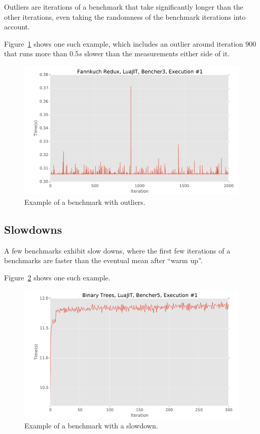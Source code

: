 \documentclass[10pt,preprint]{sigplanconf}
\begin{document}
Outliers are iterations of a benchmark that take significantly longer than the
other iterations, even taking the randomness of the benchmark iterations into
account.

Figure~\ref{fig:examples:outliers1} shows one such example, which includes an
outlier around iteration $900$ that runs more than $0.5s$ slower than the
measurements either side of it.

\begin{figure}[h!]
\centering
\includegraphics[width=.46\textwidth]{examples/outliers1}
\caption{Example of a benchmark with outliers.}
\label{fig:examples:outliers1}
\end{figure}


\subsection{Slowdowns}
\label{sub:slowdowns}


A few benchmarks exhibit slow downs, where the first few iterations of a
benchmarks are faster than the eventual mean after ``warm up''.

Figure~\ref{fig:examples:slowdown1} shows one such example.

\begin{figure}[h!]
\centering
\includegraphics[width=.46\textwidth]{examples/slowdown1}
\caption{Example of a benchmark with a slowdown.}
\label{fig:examples:slowdown1}
\end{figure}
\end{document}
